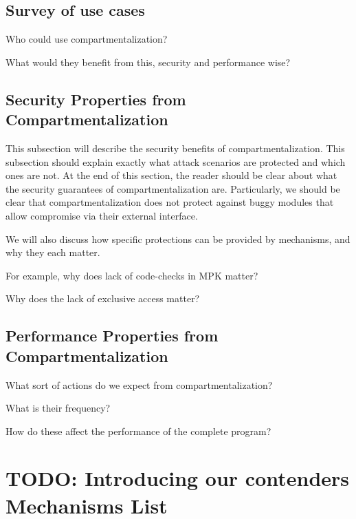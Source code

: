 

\subsection{Survey of use cases}

Who could use compartmentalization?

What would they benefit from this, security and performance wise?

\subsection{Security Properties from Compartmentalization}
This subsection will describe the security benefits of compartmentalization. This subsection should explain exactly what attack scenarios are protected and which ones are not. At the end of this section, the reader should be clear about what the security guarantees of compartmentalization are. Particularly, we should be clear that compartmentalization does not protect against buggy modules that allow compromise via their external interface.

We will also discuss how specific protections can be provided by mechanisms, and
why they each matter.

For example, why does lack of code-checks in MPK matter?

Why does the lack of exclusive access matter?

\subsection{Performance Properties from Compartmentalization}

What sort of actions do we expect from compartmentalization?

What is their frequency?

How do these affect the performance of the complete program?

\section{TODO: Introducing our contenders \\ Mechanisms List}

